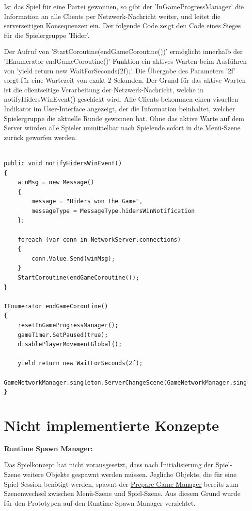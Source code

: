 Ist das Spiel für eine Partei gewonnen, so gibt der 'InGameProgressManager' die Information an alle Clients per Netzwerk-Nachricht weiter, und leitet die serverseitigen Konsequenzen ein. Der folgende Code zeigt den Code eines Sieges für die Spielergruppe 'Hider'. 

Der Aufruf von 'StartCoroutine(endGameCoroutine())' ermöglicht innerhalb der 'IEnumerator endGameCoroutine()' Funktion ein aktives Warten beim Ausführen von 'yield return new WaitForSeconds(2f);'. Die Übergabe des Parameters '2f' sorgt für eine Wartezeit von exakt 2 Sekunden. Der Grund für das aktive Warten ist die clientseitige Verarbeitung der Netzwerk-Nachricht, welche in notifyHidersWinEvent() geschickt wird. Alle Clients bekommen einen visuellen Indikator im User-Interface angezeigt, der die Information beinhaltet, welcher Spielergruppe die aktuelle Runde gewonnen hat. Ohne das aktive Warte auf dem Server würden alle Spieler unmittelbar nach Spielende sofort in die Menü-Szene zurück geworfen werden.

\begin{lstlisting}[caption= InGameProgressManager.cs Win Event]
	
public void notifyHidersWinEvent()
{
	winMsg = new Message()
	{
		message = "Hiders won the Game",
		messageType = MessageType.hidersWinNotification
	};
		
	foreach (var conn in NetworkServer.connections)
	{
		conn.Value.Send(winMsg);
	}	
	StartCoroutine(endGameCoroutine());
}

IEnumerator endGameCoroutine()
{
	resetInGameProgressManager();
	gameTimer.SetPaused(true);
	disablePlayerMovementGlobal();
	
	yield return new WaitForSeconds(2f);
	GameNetworkManager.singleton.ServerChangeScene(GameNetworkManager.singleton.offlineScene);
}

\end{lstlisting}

\section{Nicht implementierte Konzepte}
\textbf{Runtime Spawn Manager:}

Das Spielkonzept hat nicht vorausgesetzt, dass nach Initialisierung der Spiel-Szene weitere Objekte gespawnt werden müssen. Jegliche Objekte, die für eine Spiel-Session benötigt werden, spawnt der \hyperref[Implementierung:prepare_game_manager]{Prepare-Game-Manager} bereits zum Szenenwechsel zwischen Menü-Szene und Spiel-Szene. Aus diesem Grund wurde für den Prototypen auf den Runtime Spawn Manager verzichtet.


